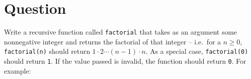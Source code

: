 \newpage

\section{Question}

Write a recursive function called \texttt{factorial} that takes as an
argument some nonnegative integer and returns the factorial of that integer --
i.e.~for a $n\geq0$, \texttt{factorial(n)} should return $1 \cdot 2
\cdots (n-1) \cdot n$.  As a special case, \texttt{factorial(0)}
should return \texttt{1}.  If the value passed is invalid, the
function should return \texttt{0}.  For example:



\newpage

